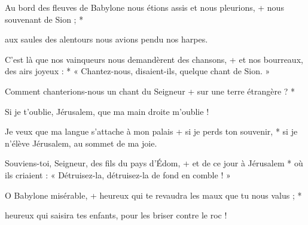 \item Au bord des fleuves de Babylone nous étions assis et nous pleurions, + nous souvenant de Sion ; *

\item aux saules des alentours nous avions pendu nos harpes.

\item C'est là que nos vainqueurs nous demandèrent des chansons, + et nos bourreaux, des airs joyeux : * « Chantez-nous, disaient-ils, quelque chant de Sion. »

\item Comment chanterions-nous un chant du Seigneur + sur une terre étrangère ? *

\item Si je t'oublie, Jérusalem, que ma main droite m'oublie !

\item Je veux que ma langue s'attache à mon palais + si je perds ton souvenir, * si je n'élève Jérusalem, au sommet de ma joie.

\item Souviens-toi, Seigneur, des fils du pays d'Édom, + et de ce jour à Jérusalem * où ils criaient : « Détruisez-la, détruisez-la de fond en comble ! »

\item O Babylone misérable, + heureux qui te revaudra les maux que tu nous valus ; *

\item heureux qui saisira tes enfants, pour les briser contre le roc !